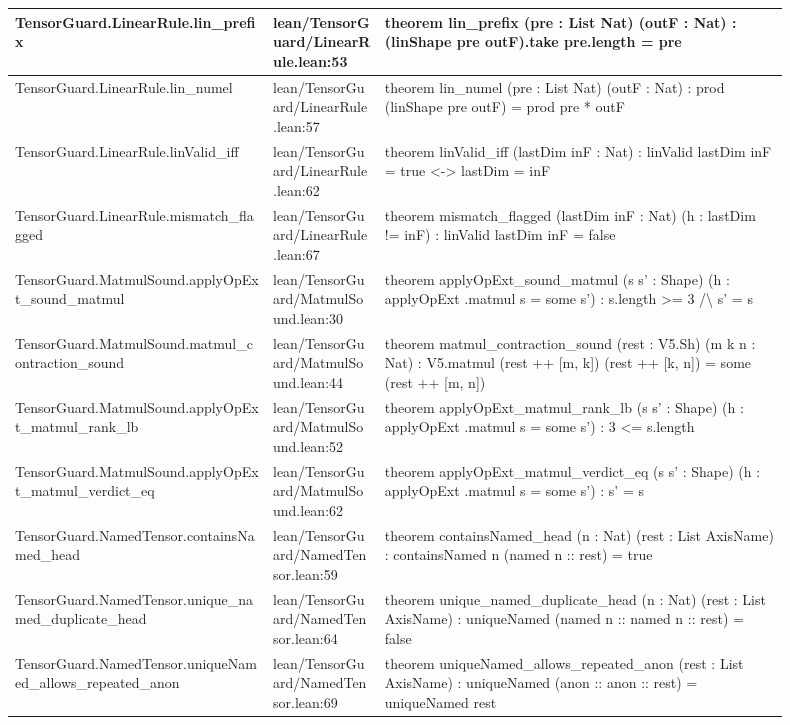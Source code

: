 \documentclass[10pt]{article}
\begin{document}
\begin{longtable}{|p{0.30\linewidth}|p{0.13\linewidth}|p{0.47\linewidth}|}
\hline
TensorGuard.LinearRule.lin\_prefix & lean/TensorGuard/LinearRule.lean:53 & theorem lin\_prefix (pre : List Nat) (outF : Nat) : (linShape pre outF).take pre.length = pre \\
\hline
TensorGuard.LinearRule.lin\_numel & lean/TensorGuard/LinearRule.lean:57 & theorem lin\_numel (pre : List Nat) (outF : Nat) : prod (linShape pre outF) = prod pre * outF \\
\hline
TensorGuard.LinearRule.linValid\_iff & lean/TensorGuard/LinearRule.lean:62 & theorem linValid\_iff (lastDim inF : Nat) : linValid lastDim inF = true <-> lastDim = inF \\
\hline
TensorGuard.LinearRule.mismatch\_flagged & lean/TensorGuard/LinearRule.lean:67 & theorem mismatch\_flagged (lastDim inF : Nat) (h : lastDim != inF) : linValid lastDim inF = false \\
\hline
TensorGuard.MatmulSound.applyOpExt\_sound\_matmul & lean/TensorGuard/MatmulSound.lean:30 & theorem applyOpExt\_sound\_matmul (s s' : Shape) (h : applyOpExt .matmul s = some s') : s.length >= 3 /\textbackslash{} s' = s \\
\hline
TensorGuard.MatmulSound.matmul\_contraction\_sound & lean/TensorGuard/MatmulSound.lean:44 & theorem matmul\_contraction\_sound (rest : V5.Sh) (m k n : Nat) : V5.matmul (rest ++ [m, k]) (rest ++ [k, n]) = some (rest ++ [m, n]) \\
\hline
TensorGuard.MatmulSound.applyOpExt\_matmul\_rank\_lb & lean/TensorGuard/MatmulSound.lean:52 & theorem applyOpExt\_matmul\_rank\_lb (s s' : Shape) (h : applyOpExt .matmul s = some s') : 3 <= s.length \\
\hline
TensorGuard.MatmulSound.applyOpExt\_matmul\_verdict\_eq & lean/TensorGuard/MatmulSound.lean:62 & theorem applyOpExt\_matmul\_verdict\_eq (s s' : Shape) (h : applyOpExt .matmul s = some s') : s' = s \\
\hline
TensorGuard.NamedTensor.containsNamed\_head & lean/TensorGuard/NamedTensor.lean:59 & theorem containsNamed\_head (n : Nat) (rest : List AxisName) : containsNamed n (named n :: rest) = true \\
\hline
TensorGuard.NamedTensor.unique\_named\_duplicate\_head & lean/TensorGuard/NamedTensor.lean:64 & theorem unique\_named\_duplicate\_head (n : Nat) (rest : List AxisName) : uniqueNamed (named n :: named n :: rest) = false \\
\hline
TensorGuard.NamedTensor.uniqueNamed\_allows\_repeated\_anon & lean/TensorGuard/NamedTensor.lean:69 & theorem uniqueNamed\_allows\_repeated\_anon (rest : List AxisName) : uniqueNamed (anon :: anon :: rest) = uniqueNamed rest \\

\end{longtable}
\end{document}
